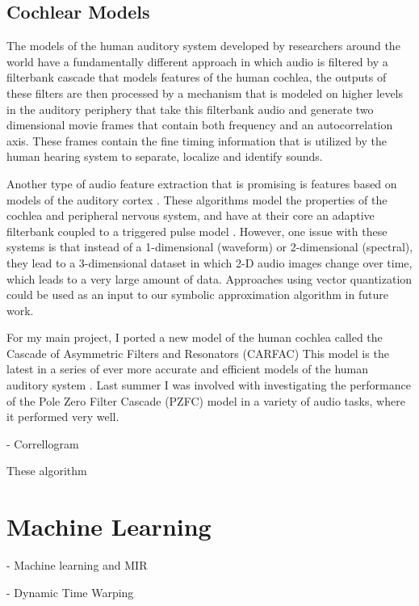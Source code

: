 \documentclass[12pt,oneside]{book}
\begin{document}
\subsection{Cochlear Models}

The models of the human auditory system developed by researchers
around the world have a fundamentally different approach in which
audio is filtered by a filterbank cascade that models features of the
human cochlea, the outputs of these filters are then processed by a
mechanism that is modeled on higher levels in the auditory periphery
that take this filterbank audio and generate two dimensional movie
frames that contain both frequency and an autocorrelation axis.  These
frames contain the fine timing information that is utilized by the
human hearing system to separate, localize and identify sounds.

Another type of audio feature extraction that is promising is features
based on models of the auditory cortex \cite{lyon82}.  These
algorithms model the properties of the cochlea and peripheral nervous
system\cite{lyon10}, and have at their core an adaptive filterbank
coupled to a triggered pulse model \cite{waltersphd}.  However, one
issue with these systems is that instead of a 1-dimensional (waveform)
or 2-dimensional (spectral), they lead to a 3-dimensional dataset in
which 2-D audio images change over time, which leads to a very large
amount of data.  Approaches using vector quantization could be used as
an input to our symbolic approximation algorithm in future work.

For my main project, I ported a new model of the human cochlea called
the Cascade of Asymmetric Filters and Resonators (CARFAC) \cite{lyon2011cas}  This model
is the latest in a series of ever more accurate and efficient models
of the human auditory system \cite{lyon82}.  Last summer I was
involved with investigating the performance of the Pole Zero Filter
Cascade (PZFC) model \cite{lyon10} in a variety of audio tasks, where
it performed very well.

- Correllogram

These algorithm 



\section{Machine Learning}
\label{section:relatedWork:machineLearning}

- Machine learning and MIR

- Dynamic Time Warping
\end{document}
